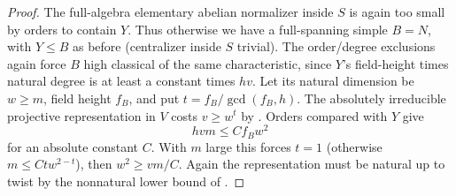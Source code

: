 \begin{proof}
The full-algebra elementary abelian normalizer inside \(S\) is again too small by orders to contain \(Y\). Thus otherwise we have a full-spanning simple \(B=N\), with \(Y\le B\) as before (centralizer inside \(S\) trivial). The order/degree exclusions again force \(B\) high classical of the same characteristic, since \(Y\)'s field-height times natural degree is at least a constant times \(h v\). Let its natural dimension be \(w\ge m\), field height \(f_B\), and put \(t=f_B/\gcd(f_B,h)\). The absolutely irreducible projective representation in \(V\) costs \(v\ge w^t\) by . Orders compared with \(Y\) give
\[
             h v m\le C f_B w^2
\]
for an absolute constant \(C\). With \(m\) large this forces \(t=1\) (otherwise \(m\le C t w^{2-t}\)), then \(w^2\ge vm/C\). Again the representation must be natural up to twist by the nonnatural lower bound of .


\end{proof}
